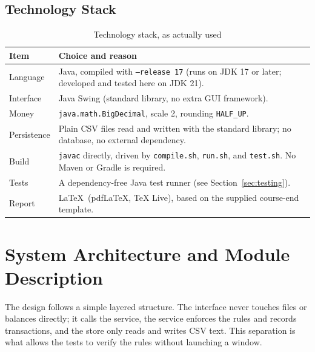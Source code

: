 \documentclass[11pt,a4paper]{report}
\begin{document}
\subsection{Technology Stack}
\begin{table}[h]
    \centering
    \caption{Technology stack, as actually used}
    \begin{tabular}{p{4cm}p{10cm}}
        \toprule
        \textbf{Item} & \textbf{Choice and reason} \\
        \midrule
        Language & Java, compiled with \texttt{--release 17} (runs on JDK 17 or later; developed and tested here on JDK 21). \\
        Interface & Java Swing (standard library, no extra GUI framework). \\
        Money & \texttt{java.math.BigDecimal}, scale 2, rounding \texttt{HALF\_UP}. \\
        Persistence & Plain CSV files read and written with the standard library; no database, no external dependency. \\
        Build & \texttt{javac} directly, driven by \texttt{compile.sh}, \texttt{run.sh}, and \texttt{test.sh}. No Maven or Gradle is required. \\
        Tests & A dependency-free Java test runner (see Section~\ref{sec:testing}). \\
        Report & \LaTeX\ (pdf\LaTeX, TeX Live), based on the supplied course-end template. \\
        \bottomrule
    \end{tabular}
\end{table}

\section{System Architecture and Module Description}
The design follows a simple layered structure. The interface never touches files or balances directly; it calls the service, the service enforces the rules and records transactions, and the store only reads and writes CSV text. This separation is what allows the tests to verify the rules without launching a window.
\end{document}
